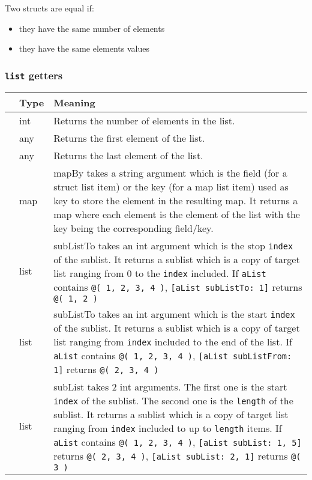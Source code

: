 \documentclass[11pt]{article}
\newcommand{\cfunction}[1]{{\ttfamily #1}}
\begin{document}
Two structs are equal if:
\begin{itemize}
\item they have the same number of elements
\item they have the same elements values
\end{itemize}

\subsubsection{\lstinline{list} getters}

\begin{longtable}{>{\ttfamily}l|l|p{3.88in}}
{\bf getter}&{\bf Type}&{\bf Meaning}\\
\hline\endhead
 {length}&
  {int}&
  {Returns the number of elements in the list.}\\
 {first}&
  {any}&
  {Returns the first element of the list.}\\
 {last}&
  {any}&
  {Returns the last element of the list.}\\
 {mapBy}&
  {map}&
  {\cfunction{mapBy} takes a string argument which is the field (for a struct list item) or the key (for a map list item) used as key to store the element in the resulting map. It returns a map where each element is the element of the list with the key being the corresponding field/key.}\\
 {subListTo}&
  {list}&
  {\cfunction{subListTo} takes an int argument which is the stop \texttt{index} of the sublist. It returns a sublist which is a copy of target list ranging from 0 to the \texttt{index} included. If \texttt{aList} contains \texttt{@( 1, 2, 3, 4 )}, \texttt{[aList subListTo: 1]} returns \texttt{@( 1, 2 )}}\\
 {subListFrom}&
  {list}&
  {\cfunction{subListTo} takes an int argument which is the start \texttt{index} of the sublist. It returns a sublist which is a copy of target list ranging from \texttt{index} included to the end of the list. If \texttt{aList} contains \texttt{@( 1, 2, 3, 4 )}, \texttt{[aList subListFrom: 1]} returns \texttt{@( 2, 3, 4 )}}\\
 {subList}&
  {list}&
  {\cfunction{subList} takes 2 int arguments. The first one is the start \texttt{index} of the sublist. The second one is the \texttt{length} of the sublist. It returns a sublist which is a copy of target list ranging from \texttt{index} included to up to \texttt{length} items. If \texttt{aList} contains \texttt{@( 1, 2, 3, 4 )}, \texttt{[aList subList: 1, 5]} returns \texttt{@( 2, 3, 4 )},  \texttt{[aList subList: 2, 1]} returns \texttt{@( 3 )}}\\
\end{longtable}
\end{document}
